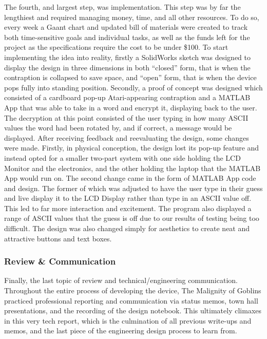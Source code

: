 \documentclass[conference]{IEEEtran}
\begin{document}
\par The fourth, and largest step, was implementation. This step was by far the lengthiest and required managing money, time, and all other resources. To do so, every week a Gaant chart and updated bill of materials were created to track both time-sensitive goals and individual tasks, as well as the funds left for the project as the specifications require the cost to be under \$100. To start implementing the idea into reality, firstly a SolidWorks sketch was designed to display the design in three dimensions in both “closed” form, that is when the contraption is collapsed to save space, and “open” form, that is when the device pops fully into standing position. Secondly, a proof of concept was designed which consisted of a cardboard pop-up Atari-appearing contraption and a MATLAB App that was able to take in a word and encrypt it, displaying back to the user. The decryption at this point consisted of the user typing in how many ASCII values the word had been rotated by, and if correct, a message would be displayed. After receiving feedback and reevaluating the design, some changes were made. Firstly, in physical conception, the design lost its pop-up feature and instead opted for a smaller two-part system with one side holding the LCD Monitor and the electronics, and the other holding the laptop that the MATLAB App would run on. The second change came in the form of MATLAB App code and design. The former of which was adjusted to have the user type in their guess and live display it to the LCD Display rather than type in an ASCII value off. This led to far more interaction and excitement. The program also displayed a range of ASCII values that the guess is off due to our results of testing being too difficult. The design was also changed simply for aesthetics to create neat and attractive buttons and text boxes. 

\subsubsection{Review \& Communication}

\par Finally, the last topic of review and technical/engineering communication. Throughout the entire process of developing the device, The Malignity of Goblins practiced professional reporting and communication via status memos, town hall presentations, and the recording of the design notebook. This ultimately climaxes in this very tech report, which is the culmination of all previous write-ups and memos, and the last piece of the engineering design process to learn from. 
\end{document}

